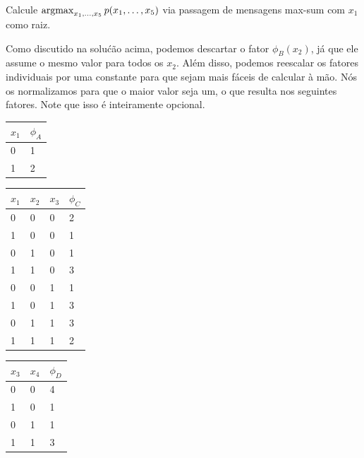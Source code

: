 \begin{exenumerate}
\begin{solution}
    \end{solution}
    \item Calcule $\operatorname*{\mathrm{argmax}}_{x_1, \ldots, x_5} p(x_1, \ldots, x_5)$ via passagem de mensagens max-sum com $x_1$ como raiz.
    \label{q:x_1-root-alt}
    \begin{solution}
        Como discutido na solu\'c\~ao acima, podemos descartar o
        fator $\phi_B(x_2)$, j\'a que ele assume o mesmo valor para todos os
        $x_2$. Al\'em disso, podemos reescalar os fatores individuais por uma
        constante para que sejam mais f\'aceis de calcular \`a m\~ao. N\'os os
        normalizamos para que o maior valor seja um, o que resulta nos
        seguintes fatores. Note que isso \'e inteiramente opcional.
        \begin{center}
            \begin{tabular}{ll}
                \toprule
                $x_1$ & $\phi_A$\\
                \midrule
                0 & 1\\
                1 & 2\\
                \bottomrule
            \end{tabular}
            \hfill
            \begin{tabular}{llll}
                \toprule
                $x_1$ & $x_2$ & $x_3$ & $\phi_C$\\
                \midrule
                0 & 0 & 0 & 2 \\
                1 & 0 & 0 & 1 \\
                0 & 1 & 0 & 1 \\
                1 & 1 & 0 & 3 \\
                0 & 0 & 1 & 1 \\
                1 & 0 & 1 & 3 \\
                0 & 1 & 1 & 3 \\
                1 & 1 & 1 & 2 \\
                \bottomrule
            \end{tabular}
            \hfill
            \begin{tabular}{lll}
                \toprule
                $x_3$ & $x_4$ & $\phi_D$\\
                \midrule
                0 & 0 &  4 \\
                1 & 0 &  1 \\
                0 & 1 &  1 \\
                1 & 1 &  3 \\

\end{tabular}
\end{center}
\end{solution}
\end{exenumerate}
